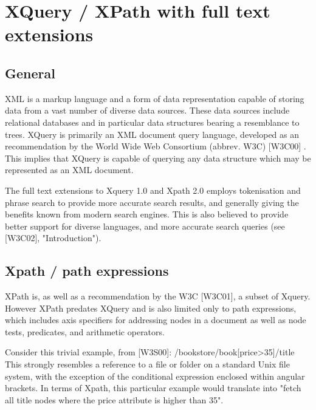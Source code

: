 \section{XQuery / XPath with full text extensions}
\subsection{General}
XML is a markup language and a form of data representation capable of storing data from a vast number of diverse data sources. These data sources include relational databases and in particular data structures bearing a resemblance to trees. XQuery is primarily an XML document query language, developed as an recommendation by the World Wide Web Consortium (abbrev. W3C)  [W3C00] . This implies that XQuery is capable of querying any data structure which may be represented as an XML document.

The full text extensions to Xquery 1.0 and Xpath 2.0 employs tokenisation and phrase search to provide more accurate search results, and generally giving the benefits known from modern search engines. This is also believed to provide better support for diverse languages, and more accurate search queries (see [W3C02], "Introduction").

\subsection{Xpath / path expressions}
XPath is, as well as a recommendation by the W3C [W3C01], a subset of Xquery. However XPath predates XQuery and is also limited only to path expressions, which includes axis specifiers for addressing nodes in a document as well as node tests, predicates, and arithmetic operators.

Consider this trivial example, from [W3S00]:
/bookstore/book[price>35]/title
This strongly resembles a reference to a file or folder on a standard Unix file system, with the exception of the conditional expression enclosed within angular brackets. In terms of Xpath, this particular example would translate into "fetch all title nodes where the price attribute is higher than 35".

